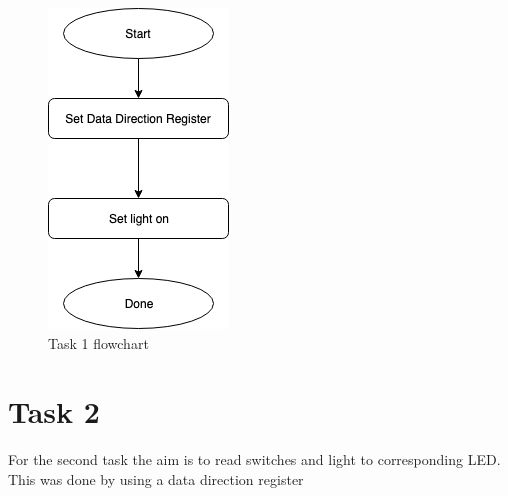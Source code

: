 \documentclass[a4paper,12pt]{article}
\begin{document}
\begin{figure}
\begin{center}
\includegraphics[width=\textwidth/3 ]{flowchart/task1_flowchart.png}
\end{center}
\caption{Task 1 flowchart}
\label{task1}
\end{figure}
\break



\section{Task 2}
For the second task the aim is to read switches and light to corresponding LED. This was done by using a data direction register 
\lstset{style=Asm}
\end{document}
